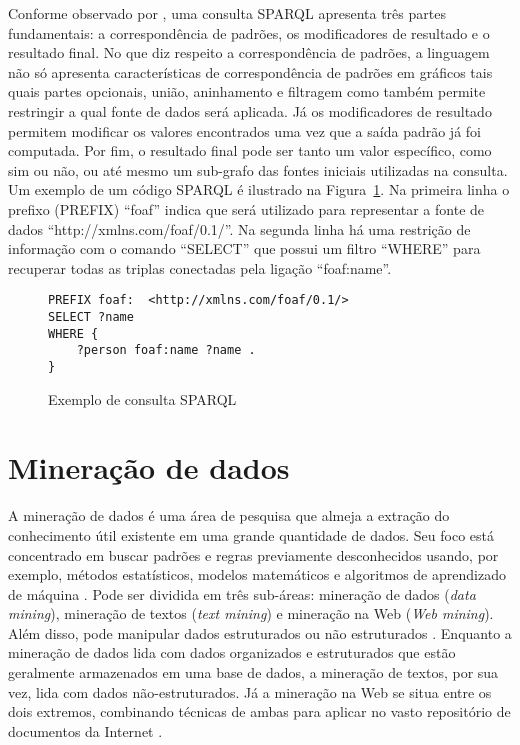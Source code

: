 Conforme observado por \citet{Perez2006}, uma consulta SPARQL apresenta três partes fundamentais: a correspondência de padrões, os modificadores de resultado e o resultado final. No que diz respeito a correspondência de padrões, a linguagem não só apresenta características de correspondência de padrões em gráficos tais quais partes opcionais, união, aninhamento e filtragem como também permite restringir a qual fonte de dados será aplicada. Já os modificadores de resultado permitem modificar os valores encontrados uma vez que a saída padrão já foi computada. Por fim, o resultado final pode ser tanto um valor específico,  como sim ou não, ou até mesmo um sub-grafo das fontes iniciais utilizadas na consulta. Um exemplo de um código SPARQL é ilustrado na Figura~\ref{fig:exemplo_codigo_sparql}. Na primeira linha o prefixo (PREFIX) ``foaf'' indica que será utilizado para representar a fonte de dados ``http://xmlns.com/foaf/0.1/''. Na segunda linha há uma restrição de informação com o comando ``SELECT'' que possui um filtro ``WHERE'' para recuperar todas as triplas conectadas pela ligação ``foaf:name''.

\begin{figure}[!ht]
    \begin{lstlisting}[language=SPARQL]
PREFIX foaf:  <http://xmlns.com/foaf/0.1/>
SELECT ?name
WHERE {
    ?person foaf:name ?name .
}
    \end{lstlisting}
    \caption{Exemplo de consulta SPARQL}
    \label{fig:exemplo_codigo_sparql} 
\end{figure}

\section{Mineração de dados}
\label{sec:mineracao_dados}

A mineração de dados é uma área de pesquisa que almeja a extração do conhecimento útil existente em uma grande quantidade de dados. Seu foco está concentrado em buscar padrões e regras previamente desconhecidos usando, por exemplo, métodos estatísticos, modelos matemáticos e algoritmos de aprendizado de máquina \citep{Quboa2013, Kabir2014}. Pode ser dividida em três sub-áreas: mineração de dados (\emph{data mining}), mineração de textos (\emph{text mining}) e mineração na Web (\emph{Web mining}). Além disso, pode manipular  dados estruturados ou não estruturados \citep{Singh2010}. Enquanto a mineração de dados lida com dados organizados e estruturados que estão geralmente armazenados em uma base de dados, a mineração de textos, por sua vez, lida com dados não-estruturados. Já a mineração na Web se situa entre os dois extremos, combinando técnicas de ambas para aplicar no vasto repositório de documentos da Internet \citep{Singh2010, Quboa2013}.

